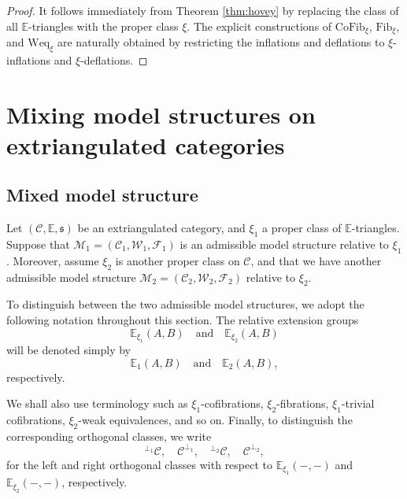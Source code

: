 \documentclass[11pt,a4paper]{amsart}
\numberwithin{equation}{section}
\theoremstyle{plain}
\begin{document}
\begin{proof}
	It follows immediately from Theorem \ref{thm:hovey} by replacing the class of all $\mathbb{E}$-triangles with the proper class $\xi$. The explicit constructions of $\mathrm{CoFib}_\xi$, $\mathrm{Fib}_\xi$, and $\mathrm{Weq}_\xi$ are naturally obtained by restricting the inflations and deflations to $\xi$-inflations and $\xi$-deflations.
\end{proof}






\section{Mixing model structures on extriangulated categories}

\subsection{Mixed model structure}

Let $(\mathscr{C},\mathbb{E}, \mathfrak{s})$ be an extriangulated category, and $\xi_1$ a proper class of $\mathbb{E}$-triangles. Suppose that $\mathcal{M}_1= (\mathcal{C}_1, \mathcal{W}_1, \mathcal{F}_1)$ is an admissible model structure relative to $\xi_1$. Moreover, assume $\xi_2$ is another proper class on $\mathscr{C}$, and that we have another admissible model structure $\mathcal{M}_2= (\mathcal{C}_2, \mathcal{W}_2, \mathcal{F}_2)$ relative to $\xi_2$.

To distinguish between the two admissible model structures, we adopt the following notation throughout this section. The relative extension groups
\[
\mathbb{E}_{\xi_1}(A,B) \quad \text{and} \quad \mathbb{E}_{\xi_2}(A,B)
\]
will be denoted simply by
\[
 \mathbb{E}_{1}(A,B) \quad \text{and} \quad  \mathbb{E}_{2}(A,B),
\]
respectively. 

We shall also use terminology such as $\xi_1$-cofibrations, $\xi_2$-fibrations, $\xi_1$-trivial cofibrations, $\xi_2$-weak equivalences, and so on. Finally, to distinguish the corresponding orthogonal classes, we write
\[
{}^{\perp_1}\mathcal{C}, \quad \mathcal{C}^{\perp_1}, \quad {}^{\perp_2}\mathcal{C}, \quad \mathcal{C}^{\perp_2},
\]
for the left and right orthogonal classes with respect to $\mathbb{E}_{\xi_1}(-,-)$ and $\mathbb{E}_{\xi_2}(-,-)$, respectively.
\end{document}
